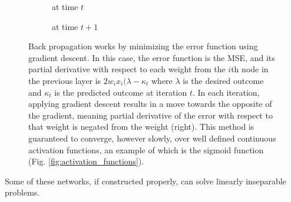 \begin{figure}[!h]
  \begin{subfigure}{0.45\linewidth}
    \caption{at time $t$}
  \end{subfigure}
  \begin{subfigure}{0.45\linewidth}
    \caption{at time $t+1$}
  \end{subfigure}
  \caption{Back propagation works by minimizing the error function using gradient descent. In this case, the error function is the MSE, and its partial derivative with respect to each weight from the $i$th node in the previous layer is $2w_ix_i(\lambda - \kappa_t$ where $\lambda$ is the desired outcome and $\kappa_t$ is the predicted outcome at iteration $t$. In each iteration, applying gradient descent results in a move towards the opposite of the gradient, meaning partial derivative of the error with respect to that weight is negated from the weight (right). This method is guaranteed to converge, however slowly, over well defined continuous activation functions, an example of which is the sigmoid function (Fig. \ref{fig:activation_functions}).}
  \label{fig:back_propagation}
\end{figure}

Some of these networks, if constructed properly, can solve linearly inseparable problems.















